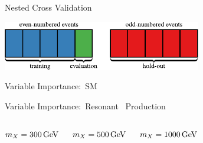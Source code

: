 \documentclass[11pt, xcolor={dvipsnames}, aspectratio=169, notes]{beamer}
\begin{document}

\begin{frame}{Nested Cross Validation}
  \centering

  \includegraphics[width=0.65\textwidth]{mva/kfold}
\end{frame}


\begin{frame}{Variable Importance:\ SM~\allbold{\HH}}
  \centering\footnotesize

  
\end{frame}


\begin{frame}{Variable Importance:\ Resonant~\allbold{\HH} Production}

  \begin{columns}
    \centering\footnotesize

    $\mX = \SI{300}{\GeV}$

    \vspace*{1em}

    

    \centering\footnotesize

    $\mX = \SI{500}{\GeV}$

    \vspace*{1em}

    

    \centering\footnotesize

    $\mX = \SI{1000}{\GeV}$

    \vspace*{1em}

    
  \end{columns}
\end{frame}

\end{document}

